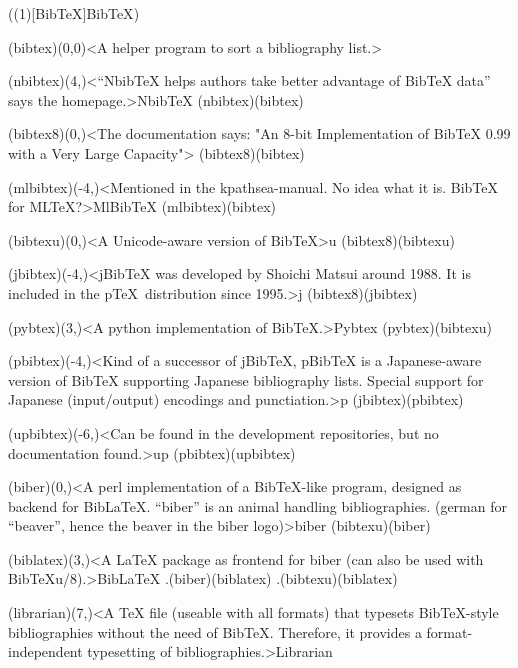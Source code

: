 \tograph(\tostruct(1)[Bib\TeX]{Bib\TeX}){
	\tonode(bibtex)(0,0)<A helper program to sort a bibliography list.>{\BibTeX}
	\steplayer[-1]

	\tonode(nbibtex)(4,\layer)<“NbibTeX helps authors take better advantage of BibTeX data” says the homepage.>{NbibTeX}
	\todraw(nbibtex)(bibtex)
	\steplayer[-0.5]

	\tonode(bibtex8)(0,\layer)<The documentation says: "An 8-bit Implementation of BibTeX 0.99 with a Very Large Capacity">{}
	\todraw(bibtex8)(bibtex)

	\tonode(mlbibtex)(-4,\layer)<Mentioned in the kpathsea-manual. No idea what it is. BibTeX for MLTeX?>{MlBibTeX}
	\todraw(mlbibtex)(bibtex)
	\steplayer
	
	\tonode(bibtexu)(0,\layer)<A Unicode-aware version of BibTeX>{\BibTeX u}
	\todraw(bibtex8)(bibtexu)

	\tonode(jbibtex)(-4,\layer)<jBibTeX was developed by Shoichi Matsui around 1988. It is included in the p\TeX\ distribution since 1995.>{j\BibTeX}
	\todraw(bibtex8)(jbibtex)

	\tonode(pybtex)(3,\layer)<A python implementation of BibTeX.>{Pybtex}
	\todraw(pybtex)(bibtexu)
	\steplayer

	\tonode(pbibtex)(-4,\layer)<Kind of a successor of jBibTeX, pBibTeX is a Japanese-aware version of BibTeX supporting Japanese bibliography lists. Special support for Japanese (input/output) encodings and punctiation.>{p\BibTeX}
	\todraw(jbibtex)(pbibtex)
	\steplayer

	\tonode(upbibtex)(-6,\layer)<Can be found in the development repositories, but no documentation found.>{up\BibTeX}
	\todraw(pbibtex)(upbibtex)
	\steplayer
	
	\tonode(biber)(0,\layer)<A perl implementation of a BibTeX-like program, designed as backend for BibLaTeX. “biber” is an animal handling bibliographies. (german for “beaver”, hence the beaver in the biber logo)>{biber}
	\todraw(bibtexu)(biber)
	
	\steplayer

	\tonode[\package](biblatex)(3,\layer)<A LaTeX package as frontend for biber (can also be used with BibTeXu/8).>{Bib\LaTeX}
	\todraw.(biber)(biblatex)
	\todraw.(bibtexu)(biblatex)

	\tonode[\package](librarian)(7,\layer)<A TeX file (useable with all formats) that typesets BibTeX-style bibliographies without the need of BibTeX. Therefore, it provides a format-independent typesetting of bibliographies.>{Librarian}
}

